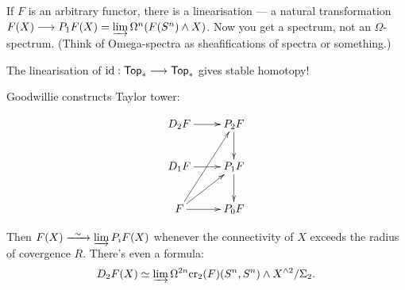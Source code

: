 \documentclass[11pt]{article}
\begin{document}
\begin{BehrensGoodwillieCalcIntro}
If $F$ is an arbitrary functor, there is a linearisation --- a natural transformation $F(X)\longrightarrow P_1F(X)=\varinjlim\Omega^n(F(S^n)\wedge X)$. Now you get a spectrum, not an $\Omega$-spectrum. (Think of Omega-spectra as sheafifications of spectra or something.)
\begin{exmp*}
The linearisation of $\textup{id}:\operatorname{{\mathsf{Top}}}_*\longrightarrow\operatorname{{\mathsf{Top}}}_*$ gives stable homotopy!
\end{exmp*}


Goodwillie constructs Taylor tower:

\[\xymatrix{
D_2F\ar[r]&\ar[d]P_2F\\
D_1F\ar[r]&\ar[d]P_1F\\
F\ar[r]\ar[ru]\ar[ruu]&P_0F
}
\]

Then $F(X)\weakequiv \varinjlim P_iF(X)$ whenever the connectivity of $X$ exceeds the radius of covergence $R$. There's even a formula:
\[D_2F(X)\simeq\varinjlim \Omega^{2n}\textup{cr}_2(F)(S^n,S^n)\wedge X^{\wedge2}/\Sigma_2.\]

\pagebreak
\end{BehrensGoodwillieCalcIntro}
\end{document}
